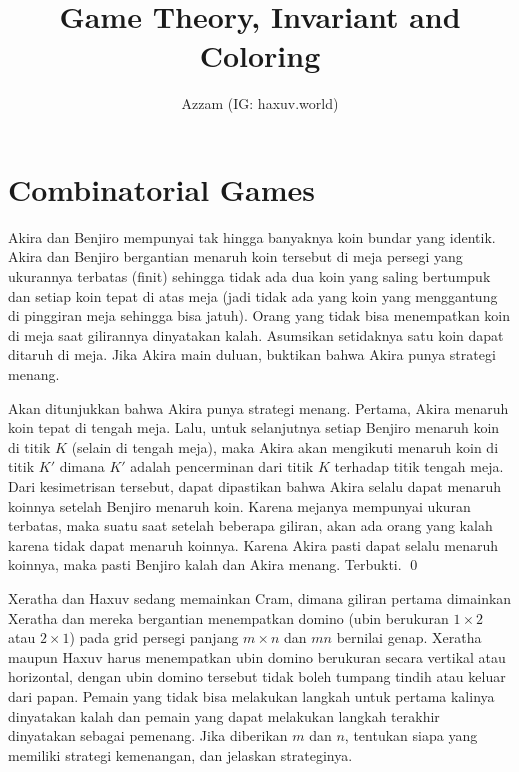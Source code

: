\documentclass[11pt]{scrartcl}
\title{Game Theory, Invariant and Coloring}
\author{Azzam (IG: haxuv.world)}
\date{}
\begin{document}
\maketitle

\section{Combinatorial Games}
\begin{soaljawab}
    Akira dan Benjiro mempunyai tak hingga banyaknya koin bundar yang identik. Akira dan Benjiro bergantian menaruh koin tersebut di meja persegi yang ukurannya terbatas (finit) sehingga tidak ada dua koin yang saling bertumpuk dan setiap koin tepat di atas meja (jadi tidak ada yang koin yang menggantung di pinggiran meja sehingga bisa jatuh). Orang yang tidak bisa menempatkan koin di meja saat gilirannya dinyatakan kalah. Asumsikan setidaknya satu koin dapat ditaruh di meja. Jika Akira main duluan, buktikan bahwa Akira punya strategi menang.

        \begin{solusi}
    Akan ditunjukkan bahwa Akira punya strategi menang. Pertama, Akira menaruh koin tepat di tengah meja. Lalu, untuk selanjutnya setiap Benjiro menaruh koin di titik $K$ (selain di tengah meja), maka Akira akan mengikuti menaruh koin di titik $K'$ dimana $K'$ adalah pencerminan dari titik $K$ terhadap titik tengah meja. Dari kesimetrisan tersebut, dapat dipastikan bahwa Akira selalu dapat menaruh koinnya setelah Benjiro menaruh koin. Karena mejanya mempunyai ukuran terbatas, maka suatu saat setelah beberapa giliran, akan ada orang yang kalah karena tidak dapat menaruh koinnya. Karena Akira pasti dapat selalu menaruh koinnya, maka pasti Benjiro kalah dan Akira menang. Terbukti. \qed
    \end{solusi}
\end{soaljawab}

\begin{soaljawab}
Xeratha dan Haxuv sedang memainkan Cram, dimana giliran pertama dimainkan Xeratha dan mereka bergantian menempatkan domino (ubin berukuran $1 \times 2$ atau $2 \times 1$) pada grid persegi panjang $m \times n$ dan $mn$ bernilai genap. Xeratha maupun Haxuv harus menempatkan ubin domino berukuran secara vertikal atau horizontal, dengan ubin domino tersebut tidak boleh tumpang tindih atau keluar dari papan. Pemain yang tidak bisa melakukan langkah untuk pertama kalinya dinyatakan kalah dan pemain yang dapat melakukan langkah terakhir dinyatakan sebagai pemenang. Jika diberikan $m$ dan $n$, tentukan siapa yang memiliki strategi kemenangan, dan jelaskan strateginya.
\end{soaljawab}
\end{document}
